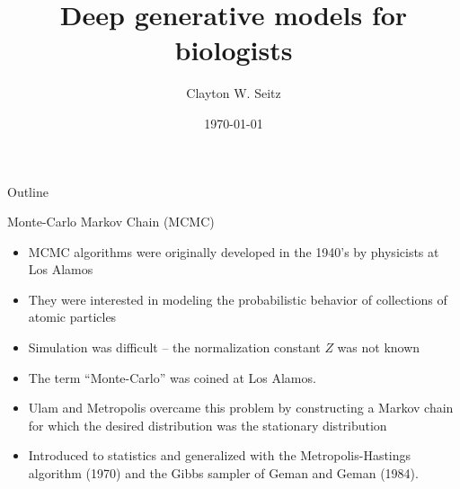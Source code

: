 \documentclass{beamer}					%
\title{Deep generative models for biologists}	%
\author{Clayton W. Seitz}								%
\date{\today}									%
\begin{document}
\begin{frame}
  \titlepage
\end{frame}

\begin{frame}{Outline}
  \tableofcontents
\end{frame}

%


\begin{frame}{Monte-Carlo Markov Chain (MCMC)}

\begin{itemize}

\item MCMC algorithms were originally developed in the 1940’s by physicists at
Los Alamos

\item They were interested in modeling the probabilistic behavior of collections of
atomic particles

\item Simulation was difficult – the normalization constant $Z$ was not known

\item The term “Monte-Carlo” was coined at Los Alamos.

\item Ulam and Metropolis overcame this problem by constructing a Markov chain
for which the desired distribution was the stationary distribution

\item Introduced to statistics and generalized with the Metropolis-Hastings
algorithm (1970) and the Gibbs sampler of Geman and Geman (1984).
\end{itemize}

\end{frame}
\end{document}
